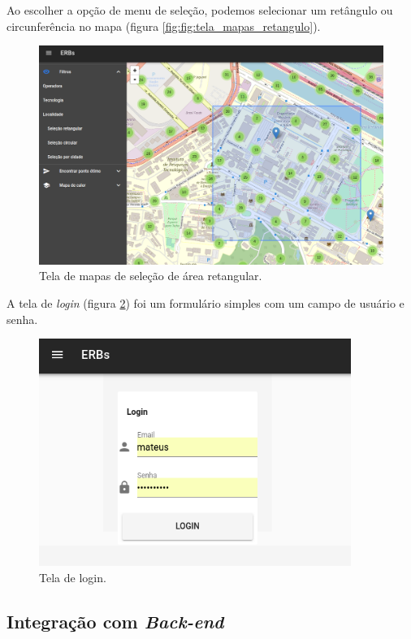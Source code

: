 \documentclass[]{politex}
\begin{document}
Ao escolher a opção de menu de seleção, podemos selecionar um retângulo ou
circunferência no mapa (figura \ref{fig:fig:tela_mapas_retangulo}).

\begin{figure}[H]
    \centering
    \includegraphics[width=6in]{imagens/tela-mapas-retangulo}
    \caption{Tela de mapas de seleção de área retangular.}
    \label{fig:tela_mapas_retangulo}
\end{figure}

A tela de \textit{login} (figura \ref{fig:tela_login}) foi um formulário simples com um campo de usuário e senha.

\begin{figure}[H]
    \centering
    \includegraphics[width=4in]{imagens/tela-login}
    \caption{Tela de login.}
    \label{fig:tela_login}
\end{figure}
\subsection{Integração com \textit{Back-end}}
\end{document}
